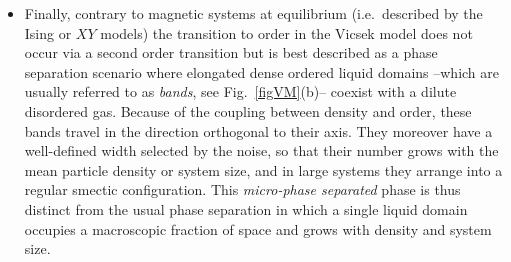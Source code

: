 \begin{itemize}
Another peculiar feature of the ordered phase can be observed by measuring the statistics of the number of particle $n(t) \equiv \int_{\cal V}{\rm d}\bm r \, \sum_i \delta(\bm r - \bm r_i^t)$ into a sub-domain of volume $\cal V$.
Namely, measuring the mean and variance of $n$ in domains of increasing sizes one finds that
\begin{equation}
\langle \Delta n^2 \rangle \sim \langle n \rangle^\phi ,
\end{equation}
with $\phi \simeq 1.6$ (see Fig.~\ref{figVM}(c))~\cite{chate2020dry}. 
In a system with `normal' density fluctuations, the law of large number would impose that $\phi = 1$. 
Here, however, $\phi > 1$, i.e.\ the variance of $n$ grows faster than its mean, 
so that density fluctuations in the homogeneous ordered phase are deemed as `anomalous', or `giant'\footnote{Note that these giant density fluctuations are not related to any clustering phenomenon (e.g.\ like the motility induced phase separation discussed in~\autoref{chap_scalar}),
but instead due to the infinite correlation length of density fluctuations in an overall spatially homogeneous system.}.
\item Finally, contrary to magnetic systems at equilibrium (i.e.\ described by the Ising or $XY$ models) the transition to order in the Vicsek model does not occur via a second order transition but is best described as a phase separation scenario where elongated dense ordered liquid domains --which are usually referred to as \textit{bands}, see Fig.~\ref{figVM}(b)-- coexist with a dilute disordered gas.
Because of the coupling between density and order, these bands travel in the direction orthogonal to their axis.
They moreover have a well-defined width selected by the noise, so that their number grows with the mean particle density or system size,
and in large systems they arrange into a regular smectic configuration.
This {\it micro-phase separated} phase is thus distinct from the usual phase separation in which a single liquid domain occupies a macroscopic fraction of space and grows with density and system size.
\end{itemize}


